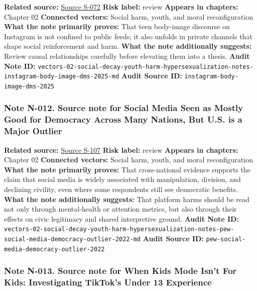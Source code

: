 \documentclass[
  american,
  11pt,
  letterpaper,
]{article}
\begin{document}
\textbf{Related source:}
\hyperref[source-s-072-unfiltered-how-teens-engage-in-body-image-and-shaming-discussions-via-instagram-direct-messages-dms]{Source
S-072} \textbf{Risk label:} review \textbf{Appears in chapters:} Chapter
02 \textbf{Connected vectors:} Social harm, youth, and moral
reconfiguration \textbf{What the note primarily proves:} That teen
body-image discourse on Instagram is not confined to public feeds; it
also unfolds in private channels that shape social reinforcement and
harm. \textbf{What the note additionally suggests:} Review causal
relationships carefully before elevating them into a thesis.
\textbf{Audit Note ID:}
\texttt{vectors-02-social-decay-youth-harm-hypersexualization-notes-instagram-body-image-dms-2025-md}
\textbf{Audit Source ID:} \texttt{instagram-body-image-dms-2025}

\subsubsection{Note N-012. Source note for Social Media Seen as Mostly
Good for Democracy Across Many Nations, But U.S. is a Major
Outlier}\label{note-n-012-vectors-02-social-decay-youth-harm-hypersexualization-notes-pew-social-media-democracy-outlier-2022-md}

\textbf{Related source:}
\hyperref[source-s-107-social-media-seen-as-mostly-good-for-democracy-across-many-nations-but-u-s-is-a-major-outlier]{Source
S-107} \textbf{Risk label:} review \textbf{Appears in chapters:} Chapter
02 \textbf{Connected vectors:} Social harm, youth, and moral
reconfiguration \textbf{What the note primarily proves:} That
cross-national evidence supports the claim that social media is widely
associated with manipulation, division, and declining civility, even
where some respondents still see democratic benefits. \textbf{What the
note additionally suggests:} That platform harms should be read not only
through mental-health or attention metrics, but also through their
effects on civic legitimacy and shared interpretive ground.
\textbf{Audit Note ID:}
\texttt{vectors-02-social-decay-youth-harm-hypersexualization-notes-pew-social-media-democracy-outlier-2022-md}
\textbf{Audit Source ID:}
\texttt{pew-social-media-democracy-outlier-2022}

\subsubsection{Note N-013. Source note for When Kids Mode Isn't For
Kids: Investigating TikTok's Under 13
Experience}\label{note-n-013-vectors-02-social-decay-youth-harm-hypersexualization-notes-tiktok-kids-mode-2025-md}
\end{document}
